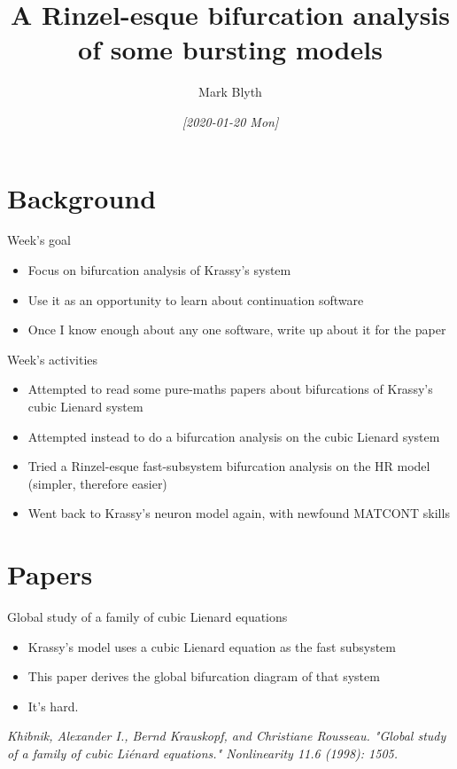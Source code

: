 \documentclass{beamer}
\author{Mark Blyth}
\date{\textit{[2020-01-20 Mon]}}
\title{A Rinzel-esque bifurcation analysis of some bursting models}
\begin{document}
\maketitle

\section{Background}
\label{sec:org26f4ace}
\begin{frame}[label={sec:orgb0f737c}]{Week's goal}
\begin{itemize}
\item Focus on bifurcation analysis of Krassy's system
\item Use it as an opportunity to learn about continuation software
\item Once I know enough about any one software, write up about it for the paper
\end{itemize}
\end{frame}
\begin{frame}[label={sec:orge1eca7e}]{Week's activities}
\begin{itemize}
\item Attempted to read some pure-maths papers about bifurcations of Krassy's cubic Lienard system
\item Attempted instead to do a bifurcation analysis on the cubic Lienard system
\item Tried a Rinzel-esque fast-subsystem bifurcation analysis on the HR model (simpler, therefore easier)
\item Went back to Krassy's neuron model again, with newfound MATCONT skills
\end{itemize}
\end{frame}

\section{Papers}
\label{sec:org391b3ee}
\begin{frame}[label={sec:orga3715f6}]{Global study of a family of cubic Lienard equations}
\begin{itemize}
\item Krassy's model uses a cubic Lienard equation as the fast subsystem
\item This paper derives the global bifurcation diagram of that system
\item It's hard.
\end{itemize}

\vfill
\emph{Khibnik, Alexander I., Bernd Krauskopf, and Christiane Rousseau. "Global study of a family of cubic Liénard equations." Nonlinearity 11.6 (1998): 1505.}
\end{frame}
\end{document}
